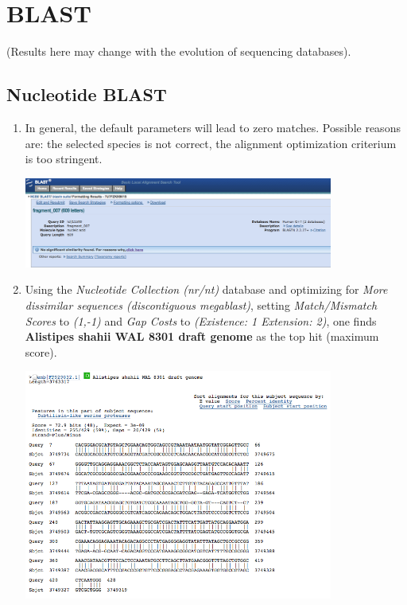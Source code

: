 \documentclass[a4paper,11pt]{article}
\begin{document}
\section{BLAST}

(Results here may change with the evolution of sequencing databases).

\subsection{Nucleotide BLAST}

\begin{enumerate}
\item In general, the default parameters will lead to zero matches. Possible reasons are: the selected species is not correct, the alignment optimization criterium is too stringent.

\vspace{0.5cm}
\begin{center}
\includegraphics[width=0.8\textwidth]{blastn1.png}
\end{center}
\vspace{0.5cm}

\item Using the \textit{Nucleotide Collection (nr/nt)} database and optimizing for \textit{More dissimilar sequences
(discontiguous megablast)}, setting \textit{Match/Mismatch Scores} to \textit{(1,-1)} and \textit{Gap Costs} to \textit{(Existence: 1 Extension: 2)}, one finds \textbf{Alistipes shahii WAL 8301 draft genome} as the top hit (maximum score).

\vspace{0.5cm}
\begin{center}
\includegraphics[width=0.8\textwidth]{blastn2.png}
\end{center}
\vspace{0.5cm}


\end{enumerate}
\end{document}
